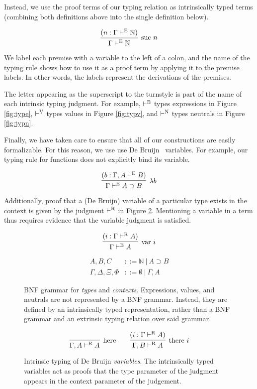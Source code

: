 \documentclass{llncs}
\newcommand{\reffig}[1]{Figure \ref{fig:#1}}
\def\arr{\supset}
\def\lam{\lambda}
\def\nat{\mathbb{N}}
\def\emp{\emptyset}
\newcommand{\turn}[1]{\vdash^\con{#1}}
\newcommand{\con}[1]{\textmd{#1}}
\newcommand{\fun}[1]{\textmd{#1}}
\newcommand{\type}[1]{\Gamma \turn{E} #1}
\newcommand{\ctype}[2]{\Gamma , #1 \turn{E} #2}
\newcommand{\typr}[1]{\Gamma \turn{R} #1}
\newcommand{\ctypr}[2]{\Gamma , #1 \turn{R} #2}
\begin{document}
Instead, we use the proof terms of our typing relation as
intrinsically typed terms (combining both definitions above into the
single definition below).

$$
\infer
  [\con{suc} ~ n]
  {\type{\nat}}
{
  (n : \type{\nat})
}
$$

We label each premise with a variable to
the left of a colon, and the name of the typing rule shows how to use
it as a proof term by applying it to the premise labels. In other
words, the labels represent the derivations of the premises.

The letter appearing as the superscript to the turnstyle is part of
the name of each intrinsic typing judgment. For example, $\turn{E}$
types expressions in \reffig{type}, $\turn{V}$ types values in
\reffig{typv}, and $\turn{N}$ types neutrals in \reffig{typn}.

Finally, we have taken care to ensure that all of our constructions
are easily formalizable. For this reason, we
use use De Bruijn~\cite{TODO} variables. For example, our typing rule
for functions does not explicitly bind its variable.

$$
\infer
  [\lam b]
  {\type{A \arr B}}
{
  (b : \ctype{A}{B})
}
$$

Additionally, proof that a (De Bruijn) variable of a particular type
exists in the context is given by the judgment $\turn{R}$ in
\reffig{typr}. Mentioning a variable in a term thus requires evidence
that the variable judgment is satisfied.

$$
\infer
  [\fun{var} ~ i]
  {\type{A}}
{
  (i : \typr{A})
}
$$

\begin{figure}[t!]
\caption{
BNF grammar for \textit{types} and \textit{contexts}. 
Expressions, values, and neutrals
are not represented by a BNF grammar. Instead, they are defined by
an intrinsically typed representation, rather than a BNF grammar and
an extrinsic typing relation over said grammar.
}
\begin{align*}
A, B, C &::= \nat ~ | ~ A \arr B \\
\Gamma, \Delta, \Xi, \Phi &::= \emp ~ | ~ \Gamma , A
\end{align*}
\label{fig:gram}
\end{figure}

\begin{figure}[t!]
\caption{
Intrinsic typing of De Bruijn \textit{variables}.
The intrinsically typed variables act as proofs that the type
parameter of the judgment appears in the context parameter of the
judgement.
}
$$
\infer
  [\con{here}]
  {\ctypr{A}{A}}
{
}
\qquad
\infer
  [\con{there} ~ i]
  {\ctypr{B}{A}}
{
  (i : \typr{A})
}
$$
\label{fig:typr}
\end{figure}
\end{document}
